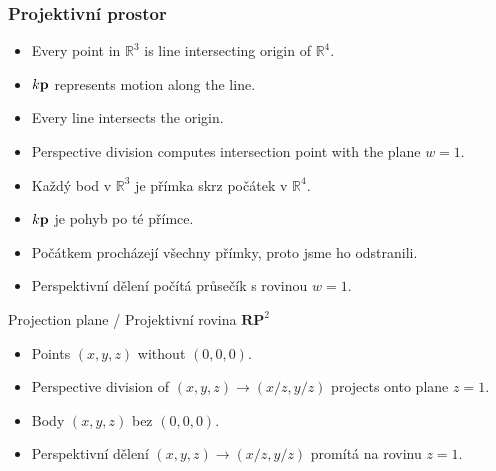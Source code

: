 \begin{frame}\frametitle{Projektivní prostor}\scriptsize
  \begin{itemize}
    \item Every point in $\mathbb{R}^3$ is line intersecting origin of $\mathbb{R}^4$.
    \item $k\mathbf{p}$ represents motion along the line.
    \item Every line intersects the origin.
    \item Perspective division computes intersection point with the plane $w = 1$.
  \end{itemize}
  \begin{itemize}
    \item Každý bod v $\mathbb{R}^3$ je přímka skrz počátek v $\mathbb{R}^4$.
    \item $k\mathbf{p}$ je pohyb po té přímce.
    \item Počátkem procházejí všechny přímky, proto jsme ho odstranili.
    \item Perspektivní dělení počítá průsečík s rovinou $w = 1$.
  \end{itemize}
  \pause\vfill
  Projection plane / Projektivní rovina $\mathbf{RP}^2$
  \begin{itemize}
    \item Points $(x,y,z)$ without $(0,0,0)$.
    \item Perspective division of $(x,y,z) \rightarrow (x/z,y/z)$ projects onto plane $z=1$.
  \end{itemize}
  \begin{itemize}
    \item Body $(x,y,z)$ bez $(0,0,0)$.
    \item Perspektivní dělení $(x,y,z) \rightarrow (x/z,y/z)$ promítá na rovinu $z=1$.
  \end{itemize}
\end{frame}
